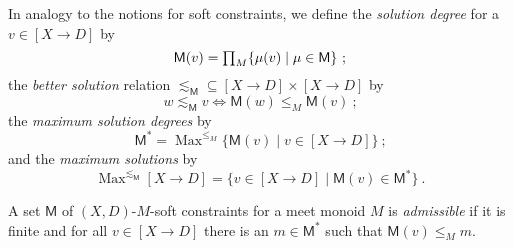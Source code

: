 \documentclass[english]{notes}
\DeclareMathOperator{\Maxop}{\mathrm{Max}}
\newcommand{\Max}[1]{\Maxop^{#1}}
\begin{document}
In analogy to the notions for soft constraints, we define the
\emph{solution degree} for a $v \in [X \to D]$ by
%
\begin{equation*}\textstyle
\textstyle
  \mathsf{M}(v) = \prod_M \{ \mu(v) \mid \mu \in \mathsf{M} \}
\ \text{;}
\end{equation*}
%
the \emph{better solution} relation ${\lesssim_{\mathsf{M}}} \subseteq [X \to
D] \times [X \to D]$ by
%
\begin{equation*}\textstyle
  w \lesssim_{\mathsf{M}} v
\iff
  \mathsf{M}(w) \leq_M \mathsf{M}(v)
\ \text{;}
\end{equation*}
%
the \emph{maximum solution degrees} by
%
\begin{equation*}
  \mathsf{M}^* = \Max{\leq_M} \{ \mathsf{M}(v) \mid v \in [X \to D] \}
\ \text{;}
\end{equation*}
%
and the \emph{maximum solutions} by
%
\begin{equation*}
  \Max{\lesssim_{\mathsf{M}}} [X \to D] = \{ v \in [X \to D] \mid \mathsf{M}(v) \in \mathsf{M}^* \}
\ \text{.}
\end{equation*}

A set $\mathsf{M}$ of $(X, D)$-$M$-soft constraints for a meet monoid
$M$ is \emph{admissible} if it is finite and for all $v \in [X \to D]$
there is an $m \in \mathsf{M}^*$ such that $\mathsf{M}(v) \leq_M m$.
\end{document}
